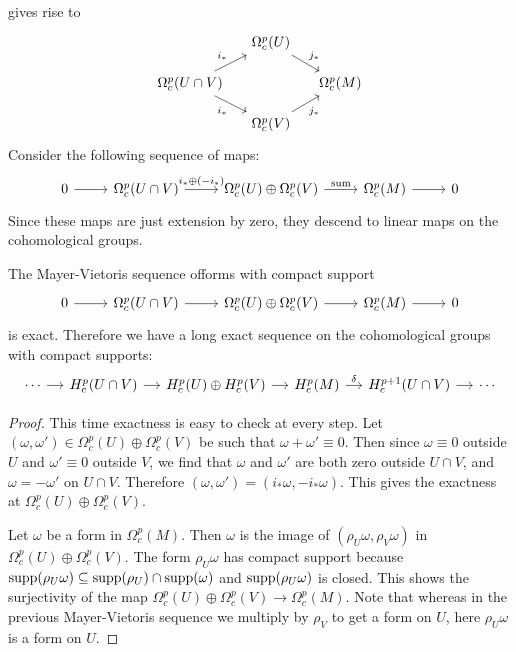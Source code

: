gives rise to
\[\begin{tikzcd}[row sep=12pt,column sep=12pt]
&\Omega^p_c(U)\ar[rd,"j_*"]&\\
\Omega^p_c(U\cap V)\ar[ru,"i_*"]\ar[rd,swap,"i_*"]&&\Omega^p_c(M)\\
&\Omega^p_c(V)\ar[ru,swap,"j_*"]&
\end{tikzcd}\]
Consider the following sequence of maps:
\[
\begin{tikzcd}
0\ar[r]&\Omega^p_c(U\cap V)\ar[r,"i_*\oplus(-i_*)"]&\Omega^p_c(U)\oplus\Omega^p_c(V)\ar[r,"\text{sum}"]&\Omega^p_c(M)\ar[r]&0
\end{tikzcd}\]
Since these maps are just extension by zero, they descend to linear maps on the cohomological groups.
\begin{proposition}
The Mayer-Vietoris sequence offorms with compact support
\[\begin{tikzcd}
0\ar[r]&\Omega^p_c(U\cap V)\ar[r]&\Omega^p_c(U)\oplus\Omega^p_c(V)\ar[r]&\Omega^p_c(M)\ar[r]&0
\end{tikzcd}\]
is exact. Therefore we have a long exact sequence on the cohomological groups with compact supports:
\[\begin{tikzcd}[column sep=small]
\cdots\ar[r]&H_c^p(U\cap V)\ar[r]&H^p_{c}(U)\oplus H^p_c(V)\ar[r]&H^p_c(M)\ar[r,"\delta"]&H^{p+1}_c(U\cap V)\ar[r]&\cdots
\end{tikzcd}\]
\end{proposition}
\begin{proof}
This time exactness is easy to check at every step. Let $(\omega,\omega')\in\Omega^p_c(U)\oplus\Omega^p_c(V)$ be such that $\omega+\omega'\equiv 0$. Then since 
$\omega\equiv 0$ outside $U$ and $\omega'\equiv 0$ outside $V$, we find that $\omega$ and $\omega'$ are both zero outside $U\cap V$, and $\omega=-\omega'$ on $U\cap V$. 
Therefore $(\omega,\omega')=(i_*\omega,-i_*\omega)$. This gives the exactness at $\Omega^p_c(U)\oplus\Omega^p_c(V)$.\par
Let $\omega$ be a form in $\Omega_c^p(M)$. Then $\omega$ is the image of $(\rho_U\omega,\rho_V\omega)$ in $\Omega^p_c(U)\oplus\Omega^p_c(V)$. The form $\rho_U\omega$ 
has compact support because $\mathrm{supp}(\rho_U\omega)\subseteq\mathrm{supp}(\rho_U)\cap\mathrm{supp}(\omega)$ and $\mathrm{supp}(\rho_U\omega)$ is closed. This shows the surjectivity of the map 
$\Omega^p_c(U)\oplus\Omega^p_c(V)\to\Omega^p_c(M)$. Note that whereas in the previous Mayer-Vietoris sequence we multiply by $\rho_V$ to get a form on $U$, here 
$\rho_U\omega$ is a form on $U$.
\end{proof}
